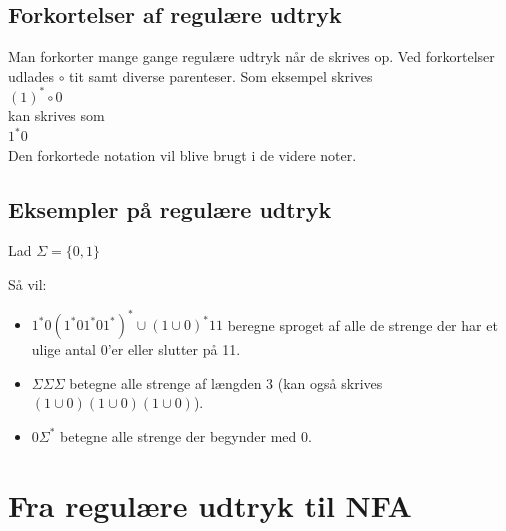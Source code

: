 \documentclass[a4paper,10pt,article]{memoir}
\begin{document}
\section{Forkortelser af regulære udtryk}
Man forkorter mange gange regulære udtryk når de skrives op.
Ved forkortelser udlades $\circ$ tit samt diverse parenteser.
Som eksempel skrives\\
$(1)^*\circ 0$\\
kan skrives som\\
$1^*0$\\
Den forkortede notation vil blive brugt i de videre noter.
\section{Eksempler på regulære udtryk}
Lad $\Sigma = \{0,1\}$

Så vil:
\begin{itemize}
\item $1^*0(1^*01^*01^*)^*  \cup (1 \cup 0)^*11$ beregne sproget af alle de strenge der har et ulige antal 0'er eller slutter på 11.
\item $\Sigma \Sigma \Sigma $ betegne alle strenge af længden 3 (kan også skrives $(1 \cup 0)(1 \cup 0)(1 \cup 0)$).
\item $0 \Sigma^*$ betegne alle strenge der begynder med 0.
\end{itemize}

\chapter{Fra regulære udtryk til NFA}
\end{document}
